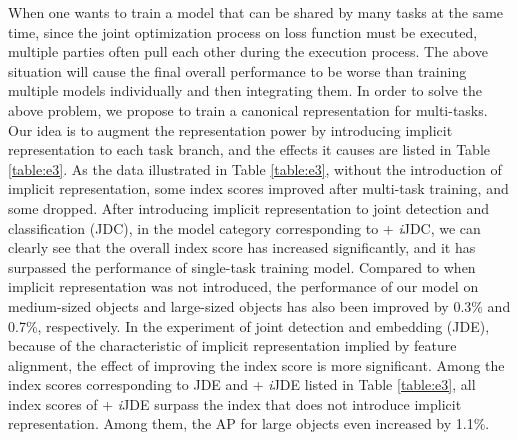 \documentclass[10pt,twocolumn,letterpaper]{article}
\begin{document}
When one wants to train a model that can be shared by many tasks at the same time, since the joint optimization process on loss function must be executed, multiple parties often pull each other during the execution process. The above situation will cause the final overall performance to be worse than training multiple models individually and then integrating them. In order to solve the above problem, we propose to train a canonical representation for multi-tasks. Our idea is to augment the representation power by introducing implicit representation to each task branch, and the effects it causes are listed in Table \ref{table:e3}. As the data illustrated in Table \ref{table:e3}, without the introduction of implicit representation, some index scores improved after multi-task training, and some dropped. After introducing implicit representation to joint detection and classification (JDC), in the model category corresponding to + \textit{i}JDC, we can clearly see that the overall index score has increased significantly, and it has surpassed the performance of single-task training model. Compared to when implicit representation was not introduced, the performance of our model on medium-sized objects and large-sized objects has also been improved by 0.3\% and 0.7\%, respectively. In the experiment of joint detection and embedding (JDE), because of the characteristic of implicit representation implied by feature alignment, the effect of improving the index score is more significant. Among the index scores corresponding to JDE and + \textit{i}JDE listed in Table \ref{table:e3}, all index scores of + \textit{i}JDE surpass the index that does not introduce implicit representation. Among them, the AP for large objects even increased by 1.1\%.
\end{document}
